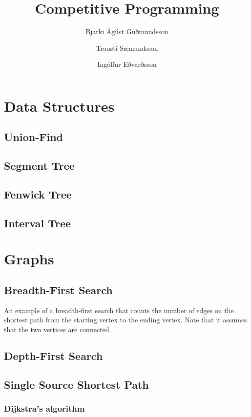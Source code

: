\documentclass[11pt,a4paper,titlepage]{article}
\title{Competitive Programming}
\author{Bjarki Ágúst Guðmundsson \and Trausti Sæmundsson \and Ingólfur Eðvarðsson}
\begin{document}
	\maketitle
	\tableofcontents
	\newpage

	\section{Data Structures}

		\subsection{Union-Find}
			

		\subsection{Segment Tree}
		\subsection{Fenwick Tree}
		\subsection{Interval Tree}

	\section{Graphs}

		\subsection{Breadth-First Search}

			An example of a breadth-first search that counts the number of edges on the shortest path from the starting vertex to the ending vertex. Note that it assumes that the two vertices are connected.

			

		\subsection{Depth-First Search}
		\subsection{Single Source Shortest Path}
			\subsubsection{Dijkstra's algorithm}
				
\end{document}
